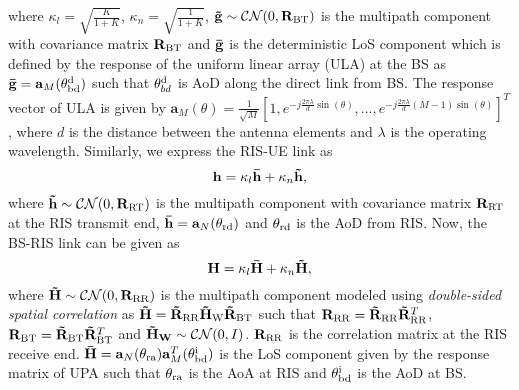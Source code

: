 \documentclass[journal,draftclsnofoot,onecolumn,12pt]{IEEEtran}
\begin{document}
where $\kappa_l = \sqrt{\frac{K}{1+K}}$, $\kappa_n = \sqrt{\frac{1}{1+K}}$, $\mathbf{\Tilde{g}}\sim\mathcal{C}\mathcal{N}(0,\mathbf{R}_{\rm BT})$ is the multipath component with covariance matrix $\mathbf{R}_{\rm BT}$ and $\mathbf{\Bar{g}}$ is the deterministic LoS component which is defined by the response of the uniform linear array (ULA) at the BS as $\mathbf{\Bar{g}} = \mathbf{a}_M(\theta_{\rm bd}^{\rm d})$ such that $\theta_{bd}^{\rm d}$ is  AoD along the direct link from BS. The response vector of ULA is given by
    $\mathbf{a}_M(\theta) = \frac{1}{\sqrt{M}}[1,e^{-j\frac{2 \pi \lambda}{d}\sin(\theta)},\ldots,e^{-j\frac{2 \pi \lambda}{d}(M-1)\sin(\theta)}]^T$, where $d$ is the distance between the antenna elements and $\lambda$ is the operating wavelength.
 Similarly, we express the RIS-UE link as 
\begin{equation}
    \mathbf{h} = \kappa_l\mathbf{\Bar{h}} + \kappa_n\mathbf{\Tilde{h}} ,\label{indirect link_h}
\end{equation}
where $\mathbf{\Tilde{h}}\sim\mathcal{C}\mathcal{N}(0,\mathbf{R}_{\rm RT})$ is the multipath component with covariance matrix $\mathbf{R}_{\rm RT}$ at the RIS transmit end, $\mathbf{\Bar{h}} = \mathbf{a}_N(\theta_{\rm rd})$ and  $\theta_{\rm rd}$ is the AoD from RIS.
Now, the BS-RIS link can be given as
 \begin{equation}
    \mathbf{H} = \kappa_l\mathbf{\Bar{H}} + \kappa_n\mathbf{\Tilde{H}} ,\label{indirect link_H}
\end{equation}
where $\mathbf{\Tilde{H}}\sim\mathcal{C}\mathcal{N}(0,\mathbf{R}_{\rm RR})$ is the multipath component modeled using \textit{double-sided spatial correlation} as $\mathbf{\Tilde{H}} = \mathbf{\Tilde{R}}_{\rm RR}\mathbf{\Tilde{H}}_{\rm W}\mathbf{\Tilde{R}}_{\rm BT}$ such that $\mathbf{R}_{\rm RR} = \mathbf{\Tilde{R}}_{\rm RR}\mathbf{\Tilde{R}}_{\rm RR}^T$, $\mathbf{R}_{\rm BT} = \mathbf{\Tilde{R}}_{\rm BT}\mathbf{\Tilde{R}}_{\rm BT}^T$ and $\mathbf{\Tilde{H}_W}\sim\mathcal{C}\mathcal{N}(0,I)$. $\mathbf{R}_{\rm RR}$ is the correlation matrix at the RIS receive end. $\mathbf{\Bar{H}} = \mathbf{a}_N(\theta_{\rm ra})\mathbf{a}^T_M(\theta_{\rm bd}^{\rm i})$ is the LoS component given by the response matrix of UPA such that $\theta_{\rm ra}$ is the AoA at  RIS and $\theta_{\rm bd}^{\rm i}$ is the AoD at  BS.
\end{document}
